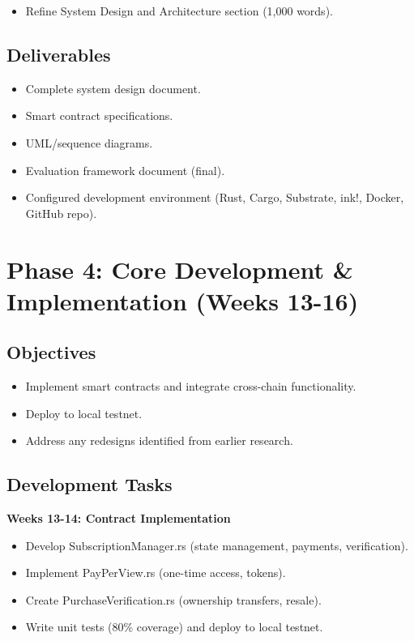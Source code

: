 \documentclass[12pt,a4paper]{article}
\begin{document}
\begin{itemize}
    \item Refine System Design and Architecture section (1,000 words).
\end{itemize}

\subsection*{Deliverables}

\begin{itemize}
    \item Complete system design document.
    \item Smart contract specifications.
    \item UML/sequence diagrams.
    \item Evaluation framework document (final).
    \item Configured development environment (Rust, Cargo, Substrate, ink!, Docker, GitHub repo).
\end{itemize}

\section{Phase 4: Core Development \& Implementation (Weeks 13-16)}

\subsection*{Objectives}

\begin{itemize}
    \item Implement smart contracts and integrate cross-chain functionality.
    \item Deploy to local testnet.
    \item Address any redesigns identified from earlier research.
\end{itemize}

\subsection*{Development Tasks}

\textbf{Weeks 13-14: Contract Implementation}
\begin{itemize}
    \item Develop SubscriptionManager.rs (state management, payments, verification).
    \item Implement PayPerView.rs (one-time access, tokens).
    \item Create PurchaseVerification.rs (ownership transfers, resale).
    \item Write unit tests (80\% coverage) and deploy to local testnet.
\end{itemize}
\end{document}
